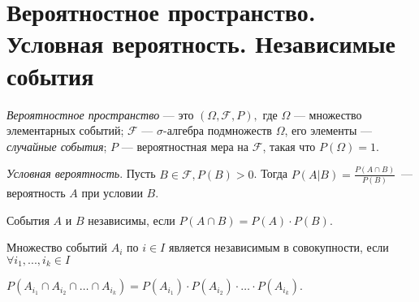 \section{Вероятностное пространство. Условная вероятность. Независимые события}

\begin{definition} \textit{Вероятностное пространство} --- это $(\Omega, \mathcal{F}, P),$ где
    $\Omega$ --- множество элементарных событий;
    $\mathcal{F}$ ---  $\sigma$-алгебра подмножеств $\Omega$, его элементы --- \textit{случайные события};
    $P$ --- вероятностная мера на $\mathcal{F}$, такая что $P(\Omega) = 1$.
\end{definition}


\begin{definition} \textit{Условная вероятность}.
    Пусть $B \in \mathcal{F}, P(B) > 0$. Тогда
    $P(A|B) = \frac{P(A\cap B)}{P(B)}$~--- вероятность $A$ при условии $B$.

\end{definition}

\begin{definition}
    События $A$ и $B$ независимы, если 
    $P(A \cap B) = P(A) \cdot P(B)$.

\end{definition}

\begin{definition}
    Множество событий $A_i$ по $i \in I$ является независимым в совокупности, если
    $\forall i_1, ..., i_k \in I$

    $P(A_{i_1}\cap A_{i_2} \cap\ldots\cap A_{i_k}) = P(A_{i_1})\cdot P(A_{i_2})\cdot\ldots\cdot P(A_{i_k})$.

\end{definition}\newpage
